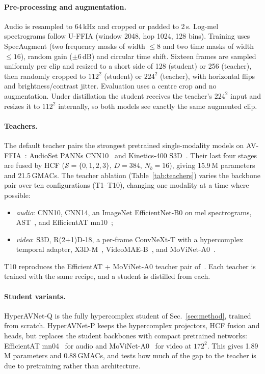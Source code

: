 \paragraph{Pre-processing and augmentation.} Audio is resampled to 64\,kHz and cropped or padded to 2\,s.
Log-mel spectrograms follow U-FFIA (window 2048, hop 1024, 128 bins). Training uses SpecAugment
(two frequency masks of width $\le8$ and two time masks of width $\le16$), random gain
($\pm6$\,dB) and circular time shift. Sixteen frames are sampled uniformly per clip and resized to a
short side of 128 (student) or 256 (teacher), then randomly cropped to $112^{2}$ (student) or $224^{2}$
(teacher), with horizontal flips and brightness/contrast jitter. Evaluation uses a centre crop and no
augmentation. Under distillation the student receives the teacher's $224^{2}$ input and resizes it to
$112^{2}$ internally, so both models see exactly the same augmented clip.

\paragraph{Teachers.} The default teacher pairs the strongest pretrained single-modality models on
AV-FFIA~\cite{cui2024uffia}: AudioSet PANNs CNN10~\cite{kong2020panns} and Kinetics-400
S3D~\cite{xie2018s3d}. Their last four stages are fused by HCF ($\mathcal{S}=\{0,1,2,3\}$, $D=384$,
$N_b=16$), giving 15.9\,M parameters and 21.5\,GMACs. The teacher ablation (Table~\ref{tab:teachers})
varies the backbone pair over ten configurations (T1--T10), changing one modality at a time where
possible:
\begin{itemize}
  \item \emph{audio}: CNN10, CNN14, an ImageNet EfficientNet-B0 on mel spectrograms, AST~\cite{gong2021ast}, and EfficientAT
mn10~\cite{schmid2023efficientat};
  \item \emph{video}: S3D, R(2+1)D-18, a per-frame ConvNeXt-T with a hypercomplex temporal adapter,
X3D-M~\cite{feichtenhofer2020x3d}, VideoMAE-B~\cite{tong2022videomae}, and MoViNet-A0~\cite{kondratyuk2021movinets}.
\end{itemize}
T10 reproduces the EfficientAT + MoViNet-A0 teacher pair of~\cite{hmkd2026}. Each teacher is trained with
the same recipe, and a student is distilled from each.

\paragraph{Student variants.} HyperAVNet-Q is the fully hypercomplex student of Sec.~\ref{sec:method},
trained from scratch. HyperAVNet-P keeps the hypercomplex projectors, HCF fusion and heads, but replaces
the student backbones with compact pretrained networks: EfficientAT mn04~\cite{schmid2023efficientat} for
audio and MoViNet-A0~\cite{kondratyuk2021movinets} for video at $172^{2}$. This gives 1.89\,M parameters
and 0.88\,GMACs, and tests how much of the gap to the teacher is due to pretraining rather than
architecture.


